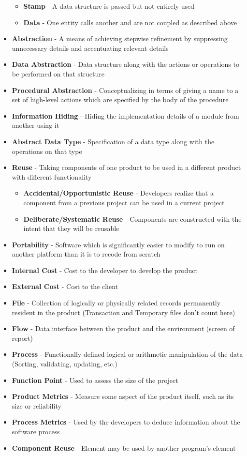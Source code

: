 \documentclass{report}
\begin{document}
\begin{itemize}
\begin{itemize}
				\item \textbf{Stamp} - A data structure is passed but not entirely used
				\item \textbf{Data} - One entity calls another and are not coupled as described above
			\end{itemize}
		\item  \textbf{Abstraction} - A means of achieving stepwise refinement by suppressing unnecessary details and accentuating relevant details
		\item \textbf{Data Abstraction} - Data structure along with the actions or operations to be performed on that structure
		\item \textbf{Procedural Abstraction} - Conceptualizing in terms of giving a name to a set of high-level actions which are specified by the body of the procedure
		\item \textbf{Information Hiding} - Hiding the implementation details of a module from another using it
		\item \textbf{Abstract Data Type} - Specification of a data type along with the operations on that type
		\item \textbf{Reuse} - Taking components of one product to be used in a different product with different functionality
			\begin{itemize}
				\item \textbf{Accidental/Opportunistic Reuse} - Developers realize that a component from a previous project can be used in a current project
				\item \textbf{Deliberate/Systematic Reuse} - Components are constructed with the intent that they will be reusable
			\end{itemize}
		\item \textbf{Portability} - Software which is significantly easier to modify to run on another platform than it is to recode from scratch
		\item \textbf{Internal Cost} - Cost to the developer to develop the product
		\item \textbf{External Cost} - Cost to the client
		\item \textbf{File} - Collection of logically or physically related records permanently resident in the product (Transaction and Temporary files don't count here)
		\item \textbf{Flow} - Data interface between the product and the environment (screen of report)
		\item \textbf{Process} - Functionally defined logical or arithmetic manipulation of the data (Sorting, validating, updating, etc.)
		\item \textbf{Function Point} - Used to assess the size of the project
		\item \textbf{Product Metrics} - Measure some aspect of the product itself, such as its size or reliability
		\item \textbf{Process Metrics} - Used by the developers to deduce information about the software process
		\item \textbf{Component Reuse} - Element may be used by another program's element
	\end{itemize}
\end{document}

